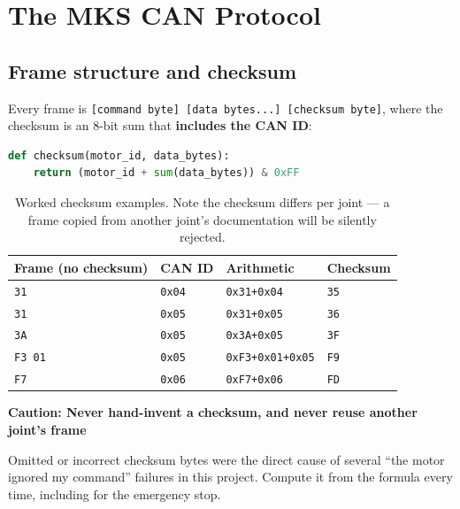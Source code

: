\documentclass[11pt,letterpaper]{article}
\newenvironment{caution}[1]{%
    \par\addvspace{8pt}%
    \noindent{\color{cautionred}\rule{\linewidth}{0.8pt}}\par\vspace{2pt}
    \noindent\textbf{\color{cautionred}Caution: #1}\par\vspace{2pt}
}{%
    \par\vspace{2pt}\noindent{\color{cautionred}\rule{\linewidth}{0.4pt}}%
    \par\addvspace{8pt}%
}
\begin{document}
\section{The MKS CAN Protocol}

\subsection{Frame structure and checksum}
Every frame is \texttt{[command byte] [data bytes...] [checksum byte]}, where the
checksum is an 8-bit sum that \textbf{includes the CAN ID}:

\begin{lstlisting}[language=python]
def checksum(motor_id, data_bytes):
    return (motor_id + sum(data_bytes)) & 0xFF
\end{lstlisting}

\begin{table}[h]
\centering
\begin{tabular}{llll}
\toprule
\textbf{Frame (no checksum)} & \textbf{CAN ID} & \textbf{Arithmetic} & \textbf{Checksum} \\ \midrule
\texttt{31}     & \texttt{0x04} & \texttt{0x31+0x04} & \texttt{35} \\
\texttt{31}     & \texttt{0x05} & \texttt{0x31+0x05} & \texttt{36} \\
\texttt{3A}     & \texttt{0x05} & \texttt{0x3A+0x05} & \texttt{3F} \\
\texttt{F3 01}  & \texttt{0x05} & \texttt{0xF3+0x01+0x05} & \texttt{F9} \\
\texttt{F7}     & \texttt{0x06} & \texttt{0xF7+0x06} & \texttt{FD} \\
\bottomrule
\end{tabular}
\caption{Worked checksum examples. Note the checksum differs per joint --- a frame
copied from another joint's documentation will be silently rejected.}
\end{table}

\begin{caution}{Never hand-invent a checksum, and never reuse another joint's frame}
Omitted or incorrect checksum bytes were the direct cause of several ``the motor
ignored my command'' failures in this project. Compute it from the formula every
time, including for the emergency stop.
\end{caution}
\end{document}
